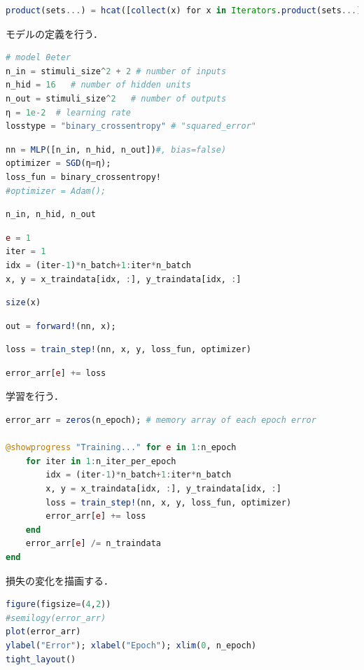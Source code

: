 \begin{lstlisting}[language=julia]
product(sets...) = hcat([collect(x) for x in Iterators.product(sets...)]...)' # Array of Cartesian product of sets 
\end{lstlisting}
モデルの定義を行う．
\begin{lstlisting}[language=julia]
# model θeter
n_in = stimuli_size^2 + 2 # number of inputs
n_hid = 16   # number of hidden units
n_out = stimuli_size^2   # number of outputs
η = 1e-2  # learning rate
losstype = "binary_crossentropy" # "squared_error"
\end{lstlisting}
\begin{lstlisting}[language=julia]
nn = MLP([n_in, n_hid, n_out])#, bias=false)
optimizer = SGD(η=η);
loss_fun = binary_crossentropy!
#optimizer = Adam();
\end{lstlisting}
\begin{lstlisting}[language=julia]
n_in, n_hid, n_out
\end{lstlisting}
\begin{lstlisting}[language=julia]
e = 1
iter = 1
idx = (iter-1)*n_batch+1:iter*n_batch
x, y = x_traindata[idx, :], y_traindata[idx, :]
\end{lstlisting}
\begin{lstlisting}[language=julia]
size(x)
\end{lstlisting}
\begin{lstlisting}[language=julia]
out = forward!(nn, x);
\end{lstlisting}
\begin{lstlisting}[language=julia]
loss = train_step!(nn, x, y, loss_fun, optimizer)
\end{lstlisting}
\begin{lstlisting}[language=julia]
error_arr[e] += loss
\end{lstlisting}
学習を行う．
\begin{lstlisting}[language=julia]
error_arr = zeros(n_epoch); # memory array of each epoch error

@showprogress "Training..." for e in 1:n_epoch
    for iter in 1:n_iter_per_epoch
        idx = (iter-1)*n_batch+1:iter*n_batch
        x, y = x_traindata[idx, :], y_traindata[idx, :]
        loss = train_step!(nn, x, y, loss_fun, optimizer)
        error_arr[e] += loss
    end 
    error_arr[e] /= n_traindata
end
\end{lstlisting}
損失の変化を描画する．
\begin{lstlisting}[language=julia]
figure(figsize=(4,2))
#semilogy(error_arr)
plot(error_arr)
ylabel("Error"); xlabel("Epoch"); xlim(0, n_epoch)
tight_layout()
\end{lstlisting}
